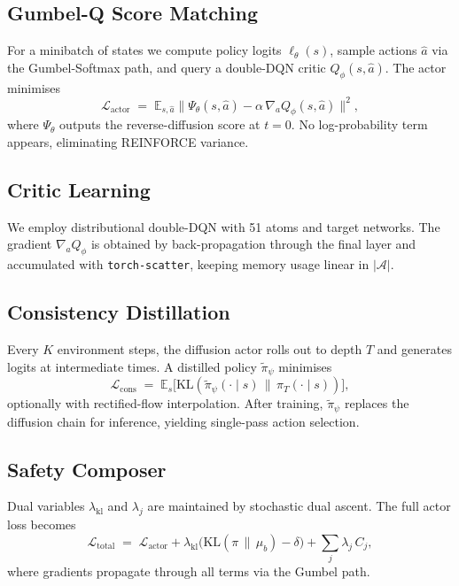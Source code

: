 \documentclass{article} %
\begin{document}
\subsection{Gumbel-Q Score Matching}
For a minibatch of states we compute policy logits $\ell_{\theta}(s)$, sample actions $\hat{a}$ via the Gumbel-Softmax path, and query a double-DQN critic $Q_{\phi}(s,\hat{a})$. The actor minimises
\[
  \mathcal{L}_{\text{actor}}\;=\;\mathbb{E}_{s,\hat{a}} \bigl\|\Psi_{\theta}(s,\hat{a})-\alpha\,\nabla_{a} Q_{\phi}(s,\hat{a})\bigr\|^{2},
\]
where $\Psi_{\theta}$ outputs the reverse-diffusion score at $t=0$. No log-probability term appears, eliminating REINFORCE variance.

\subsection{Critic Learning}
We employ distributional double-DQN with 51 atoms and target networks. The gradient $\nabla_{a} Q_{\phi}$ is obtained by back-propagation through the final layer and accumulated with \texttt{torch-scatter}, keeping memory usage linear in $|\mathcal{A}|$.

\subsection{Consistency Distillation}
Every $K$ environment steps, the diffusion actor rolls out to depth $T$ and generates logits at intermediate times. A distilled policy $\tilde{\pi}_{\psi}$ minimises
\[
  \mathcal{L}_{\text{cons}}\;=\;\mathbb{E}_{s}\bigl[ \mathrm{KL}(\tilde{\pi}_{\psi}(\cdot\mid s)\,\|\,\pi_{T}(\cdot\mid s)) \bigr],
\]
optionally with rectified-flow interpolation. After training, $\tilde{\pi}_{\psi}$ replaces the diffusion chain for inference, yielding single-pass action selection.

\subsection{Safety Composer}
Dual variables $\lambda_{\text{kl}}$ and $\lambda_{j}$ are maintained by stochastic dual ascent. The full actor loss becomes
\[
  \mathcal{L}_{\text{total}}\;=\;\mathcal{L}_{\text{actor}}+\lambda_{\text{kl}}\bigl(\mathrm{KL}(\pi\,\|\,\mu_{b})-\delta\bigr)+\sum_{j}\lambda_{j}\,C_{j},
\]
where gradients propagate through all terms via the Gumbel path.
\end{document}
